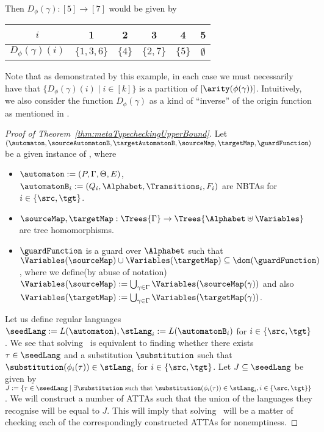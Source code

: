 Then $D_{\phi}(\gamma) : [5] \to [7]$ would be given by

\begin{tabular}{|c||c|c|c|c|c|}
  \hline
  $i$ & 1 & 2 & 3 & 4 & 5 \\\hline
  $D_{\phi}(\gamma)(i)$ & $\{1, 3, 6\}$ & $\{4\}$ & $\{2, 7\}$ & $\{5\}$ & $\emptyset$ \\\hline
\end{tabular}

Note that as demonstrated by this example, in each case we must necessarily have that $\{D_{\phi}(\gamma)(i) \mid i \in [k]\}$ is a partition of $[\arity(\phi(\gamma))]$. Intuitively, we also consider the function $D_{\phi}(\gamma)$ as a kind of ``inverse'' of the origin function as mentioned in \cite{BojanOrigin14}.

\begin{proof}[Proof of Theorem~\ref{thm:metaTypecheckingUpperBound}]
  Let $(\automaton, \sourceAutomatonB, \targetAutomatonB, \sourceMap, \targetMap, \guardFunction)$ be a given instance of \metaTypecheckingProblemFull, where
  \begin{itemize}
    \item $\automaton := (P, \Gamma, \Theta, E)$, $\automatonB_i := (Q_i, \Alphabet, \Transitions_i, F_i)$ are NBTAs for $i \in \{\src, \tgt\}$.
    \item $\sourceMap, \targetMap : \Trees{\Gamma} \to \Trees{\Alphabet\uplus\Variables}$ are tree homomorphisms.
    \item $\guardFunction$ is a guard over $\Alphabet$ such that $\Variables(\sourceMap) \cup \Variables(\targetMap) \subseteq \dom(\guardFunction)$, where we define(by abuse of notation) $\Variables(\sourceMap) := \bigcup_{\gamma \in \Gamma} \Variables(\sourceMap(\gamma))$ and also $\Variables(\targetMap) := \bigcup_{\gamma \in \Gamma} \Variables(\targetMap(\gamma))$.
  \end{itemize}
  Let us define regular languages $\seedLang := L(\automaton), \stLang_i := L(\automatonB_i)$ for $i \in \{\src, \tgt\}$. We see that solving \metaTypecheckingProblemFull\ is equivalent to finding whether there exists $\tau \in \seedLang$ and a substitution $\substitution$ such that $\substitution(\phi_i(\tau)) \in \stLang_i$ for $i \in \{\src, \tgt\}$. Let $J \subseteq \seedLang$ be given by $J := \{\tau \in \seedLang \mid \exists\substitution\mbox{ such that }\substitution(\phi_i(\tau)) \in \stLang_i, i \in \{\src, \tgt\}\}$. We will construct a number of ATTAs such that the union of the languages they recognise will be equal to $J$. This will imply that solving \metaTypecheckingProblemFull\ will be a matter of checking each of the correspondingly constructed ATTAs for nonemptiness.


\end{proof}
